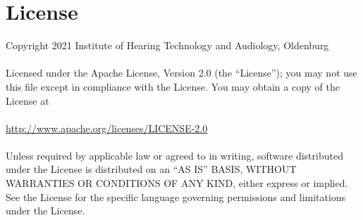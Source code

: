 \documentclass[11pt,a4paper,titlepage]{article}
\newcommand{\Institute}{Institute of Hearing Technology and Audiology, Oldenburg}
\begin{document}
 
\section{License}

 Copyright 2021 \Institute\\
\\
   Licensed under the Apache License, Version 2.0 (the ``License'');
   you may not use this file except in compliance with the License.
   You may obtain a copy of the License at\\
\\
	 \url{http://www.apache.org/licenses/LICENSE-2.0}\\
\\
   Unless required by applicable law or agreed to in writing, software
   distributed under the License is distributed on an ``AS IS'' BASIS,
   WITHOUT WARRANTIES OR CONDITIONS OF ANY KIND, either express or implied.
   See the License for the specific language governing permissions and
   limitations under the License.
\end{document}
